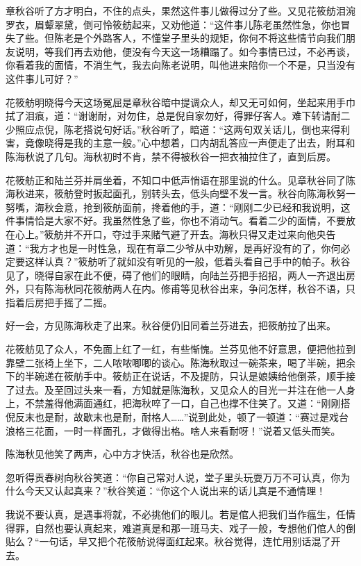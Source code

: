 \documentclass[12pt,UTF8]{ctexbook}
\begin{document}
{{{章秋谷听了方才明白，不住的点头，果然这件事儿做得过分了些。又见花筱舫泪涴罗衣，眉颦翠黛，倒可怜筱舫起来，又劝他道：“这件事儿陈老虽然性急，你也冒失了些。但陈老是个外路客人，不懂堂子里头的规矩，你何不将这些情节向我们朋友说明，等我们再去劝他，便没有今天这一场糟蹋了。如今事情已过，不必再谈，你看着我的面情，不消生气，我去向陈老说明，叫他进来陪你一个不是，只当没有这件事儿可好？”

花筱舫明晓得今天这场冤屈是章秋谷暗中提调众人，却又无可如何，坐起来用手巾拭了泪痕，道：“谢谢耐，对勿住，总是倪自家勿好，得罪仔客人。难下转请耐二少照应点倪，陈老搭说句好话。”秋谷听了，暗道：“这两句双关话儿，倒也来得利害，竟像晓得是我的主意一般。”心中想着，口内胡乱答应一声便走了出去，附耳和陈海秋说了几句。海秋初时不肯，禁不得被秋谷一把衣袖拉住了，直到后房。

花筱舫正和陆兰芬并肩坐着，不知口中低声悄语在那里说的什么。见章秋谷同了陈海秋进来，筱舫登时扳起面孔，别转头去，低头向壁不发一言。秋谷向陈海秋努一努嘴，海秋会意，抢到筱舫面前，搀着他的手，道：“刚刚二少已经和我说明，这件事情恰是大家不好。我虽然性急了些，你也不消动气。看着二少的面情，不要放在心上。”筱舫并不开口，夺过手来赌气避了开去。海秋只得又走过来向他央告道：“我方才也是一时性急，现在有章二少爷从中劝解，是再好没有的了，你何必定要这样认真？”筱舫听了就如没有听见的一般，低着头看自己手中的帕子。秋谷见了，晓得自家在此不便，碍了他们的眼睛，向陆兰芬把手招招，两人一齐退出房外，只有陈海秋同花筱舫两人在内。修甫等见秋谷出来，争问怎样，秋谷不语，只指着后房把手摇了二摇。

好一会，方见陈海秋走了出来。秋谷便仍旧同着兰芬进去，把筱舫拉了出来。

花筱舫见了众人，不免面上红了一红，有些惭愧。兰芬见他不好意思，便把他拉到靠壁二张椅上坐下，二人哝哝唧唧的谈心。陈海秋取过一碗茶来，喝了半碗，把余下的半碗递在筱舫手中。筱舫正在说话，不及提防，只认是娘姨给他倒茶，顺手接了过去。及至回过头来一看，方知就是陈海秋，又见众人的目光一并注在他一人身上，不禁羞得他满面通红，把海秋啐了一口，自己也撑不住笑了。又道：“刚刚搭倪反末也是耐，故歇末也是耐，耐格人……”说到此处，顿了一顿道：“赛过是戏台浪格三花面，一时一样面孔，才做得出格。啥人来看耐呀！”说着又低头而笑。

陈海秋见他笑了两声，心中方才快活，秋谷也是欣然。

忽听得贡春树向秋谷笑道：“你自己常对人说，堂子里头玩耍万万不可认真，你为什么今天又认起真来？”秋谷笑道：“你这个人说出来的话儿真是不通情理！

我说不要认真，是遇事将就，不必挑他们的眼儿。若是倌人把我们当作瘟生，任情得罪，自然也要认真起来，难道真是和那一班马夫、戏子一般，专想他们倌人的倒贴么？“一句话，早又把个花筱舫说得面红起来。秋谷觉得，连忙用别话混了开去。

}}}
\end{document}
